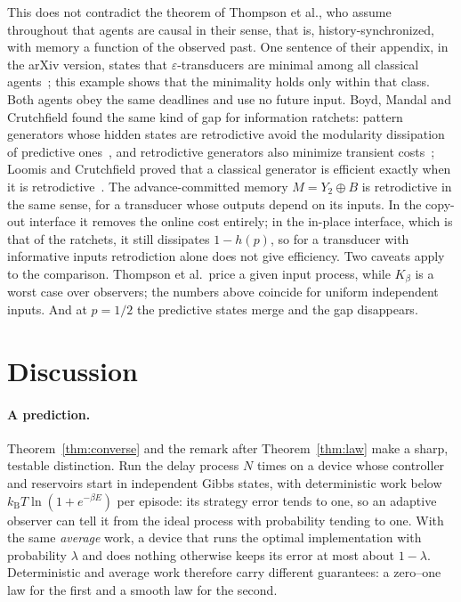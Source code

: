 \documentclass[11pt]{article}
\theoremstyle{definition}
\theoremstyle{remark}
\newcommand{\kB}{k_{\mathrm B}}
\newcommand{\Kb}{K_\beta}
\begin{document}
This does not contradict the theorem of Thompson et al., who assume throughout that agents are causal in their sense, that is, history-synchronized, with memory a function of the observed past. One sentence of their appendix, in the arXiv version, states that $\varepsilon$-transducers are minimal among all classical agents~\cite{Thompson25}; this example shows that the minimality holds only within that class. Both agents obey the same deadlines and use no future input. Boyd, Mandal and Crutchfield found the same kind of gap for information ratchets: pattern generators whose hidden states are retrodictive avoid the modularity dissipation of predictive ones~\cite{BMC18}, and retrodictive generators also minimize transient costs~\cite{BMRC17}; Loomis and Crutchfield proved that a classical generator is efficient exactly when it is retrodictive~\cite{LoomisCrutchfield20}. The advance-committed memory $M=Y_2\oplus B$ is retrodictive in the same sense, for a transducer whose outputs depend on its inputs. In the copy-out interface it removes the online cost entirely; in the in-place interface, which is that of the ratchets, it still dissipates $1-h(p)$, so for a transducer with informative inputs retrodiction alone does not give efficiency. Two caveats apply to the comparison. Thompson et al.\ price a given input process, while $\Kb$ is a worst case over observers; the numbers above coincide for uniform independent inputs. And at $p=1/2$ the predictive states merge and the gap disappears.

\section{Discussion}\label{sec:discussion}

\paragraph{A prediction.} Theorem~\ref{thm:converse} and the remark after Theorem~\ref{thm:law} make a sharp, testable distinction. Run the delay process $N$ times on a device whose controller and reservoirs start in independent Gibbs states, with deterministic work below $\kB T\ln(1+e^{-\beta E})$ per episode: its strategy error tends to one, so an adaptive observer can tell it from the ideal process with probability tending to one. With the same \emph{average} work, a device that runs the optimal implementation with probability $\lambda$ and does nothing otherwise keeps its error at most about $1-\lambda$. Deterministic and average work therefore carry different guarantees: a zero--one law for the first and a smooth law for the second.
\end{document}
